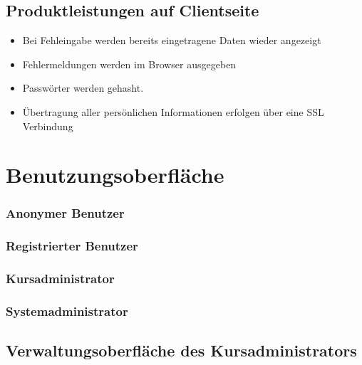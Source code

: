 \documentclass[a4paper]{scrreprt}
\newcounter{Lc}
\newcounter{Hc}
\newcommand{\stepHc}{\stepcounter{Hc}\setcounter{Lc}{0}}
\begin{document}
	
	\stepHc	
	\section{Produktleistungen auf Clientseite}
	\begin{itemize}
		\item \Func{} Bei Fehleingabe werden bereits eingetragene Daten wieder angezeigt
		\item \Func{} Fehlermeldungen werden im Browser ausgegeben
		\item \Func{} Passwörter werden gehasht.
		\item \Func{} Übertragung aller persönlichen Informationen erfolgen über eine SSL Verbindung
	\end{itemize}
	
		
		
 
\chapter{Benutzungsoberfläche}
    
    
    \subsection{Anonymer Benutzer}
       	
       	
       	
    \subsection{Registrierter Benutzer}
       
       	
       	    
    \subsection{Kursadministrator}
        
        

    \subsection{Systemadministrator}
        
        
            
   
    
    \section{Verwaltungsoberfläche des Kursadministrators}
    
\end{document}
